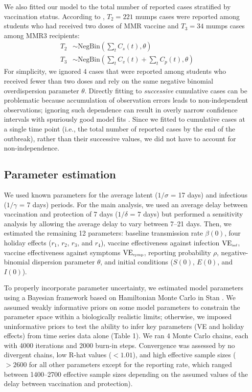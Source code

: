 \documentclass[12pt]{article}
\begin{document}
We also fitted our model to the total number of reported cases stratified by vaccination status.
According to \cite{cardemil2017effectiveness}, $T_2 = 221$ mumps cases were reported among students who had received two doses of MMR vaccine and $T_3 = 34$ mumps cases among MMR3 recipients:
\begin{align}
T_2 &\sim \mathrm{NegBin}\left(\sum_{t} C_s(t), \theta\right)\\
T_3 &\sim \mathrm{NegBin}\left(\sum_{t} C_v(t) + \sum_{t} C_p(t), \theta\right)
\end{align}
For simplicity, we ignored 4 cases that were reported among students who received fewer than two doses and rely on the same negative binomial overdispersion parameter $\theta$.
Directly fitting to \emph{successive} cumulative cases can be problematic because accumulation of observation errors leads to non-independent observations;
ignoring such dependence can result in overly narrow confidence intervals with spuriously good model fits \citep{king2015avoidable}.
Since we fitted to cumulative cases at a single time point (i.e., the total number of reported cases by the end of the outbreak), rather than their successive values, we did not have to account for non-independence.

\subsection{Parameter estimation}

We used known parameters for the average latent ($1/\sigma$ = 17 days) and infectious ($1/\gamma$ = 7 days) periods.
For the main analysis, we used an average delay between vaccination and protection of 7 days ($1/\delta$ = 7 days) but performed a sensitivity analysis by allowing the average delay to vary between 7--21 days.
Then, we estimated the remaining 12 parameters: baseline transmission rate $\beta(0)$, four holiday effects ($r_1$, $r_2$, $r_3$, and $r_4$), vaccine effectiveness against infection $\mathrm{VE}_{\textrm{\tiny{inf}}}$, vaccine effectiveness against symptoms $\mathrm{VE}_{\textrm{\tiny{symp}}}$, reporting probability $\rho$, negative-binomial dispersion parameter $\theta$, and initial conditions ($S(0)$, $E(0)$, and $I(0)$).

To properly incorporate parameter uncertainty, we estimated model parameters using a Bayesian framework based on Hamiltonian Monte Carlo in Stan \citep{carpenter2017stan}.
We assumed weakly informative priors on some model parameters to constrain the parameter space within a biologically realistic limits;
otherwise, we imposed uninformative priors to test the ability to infer key parameters (VE and holiday effects) from time series data alone (Table 1).
We ran 4 Monte Carlo chains, each with 4000 iterations and 2000 burn-in steps.
Convergence was assessed by no divergent chains, low R-hat values ($< 1.01$), and high effective sample sizes ($>2600$ for all other parameters except for the reporting rate, which ranged between 1400--2700 effective sample sizes depending on the assumed values of the delay between vaccination and protection).
\end{document}
